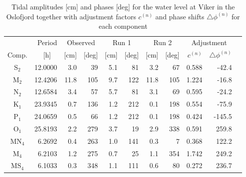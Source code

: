 \begin{table}[ht]
\caption{Tidal amplitudes [cm] and phases [deg] for the water level at Viker in the Oslofjord together with adjustment factors $c^{(n)}$ and phase shifts $\triangle \phi^{(n)}$ for each component}
\label{tab:Viker}
\centering
\begin{tabular}{crrrrrrrrrr} \hline
       & Period & \multicolumn{2}{c}{Observed} & \multicolumn{2}{c}{Run 1} & \multicolumn{2}{c}{Run 2} & \multicolumn{2}{c}{Adjustment} \\
Comp.  & [h] $\;\;$ & [cm] & [deg] & [cm] & [deg] & [cm] & [deg] & $c^{(n)}$ & $\triangle \phi^{(n)}$  \\ \hline 
S$_2$  &  12.0000 &   3.0 &  39 &    5.1 &  81 &    3.2 &  67 &    0.588 &   -42.4   \\
M$_2$  &  12.4206 &  11.8 & 105 &    9.7 & 122 &   11.8 & 105 &    1.224 &   -16.8   \\
N$_2$  &  12.6584 &   3.4 &  57 &    5.7 &  81 &    3.1 &  69 &    0.595 &   -24.2   \\
K$_1$  &  23.9345 &   0.7 & 136 &    1.2 & 212 &    0.1 & 198 &    0.554 &   -75.9   \\
P$_1$  &  24.0659 &   0.5 &  66 &    1.2 & 212 &    0.1 & 198 &    0.424 &  -145.5   \\
O$_1$  &  25.8193 &   2.2 & 279 &    3.7 &  19 &    2.9 & 338 &    0.591 &   259.8   \\
MN$_4$ &   6.2692 &   0.4 & 263 &    1.0 & 141 &    0.3 &   7 &    0.368 &   122.2   \\
M$_4$  &   6.2103 &   1.2 & 275 &    0.7 &  25 &    1.1 & 354 &    1.742 &   249.2   \\
MS$_4$ &   6.1033 &   0.3 & 348 &    1.1 & 111 &    0.6 &  80 &    0.272 &   236.7   \\ \hline
\end{tabular}
\end{table}


